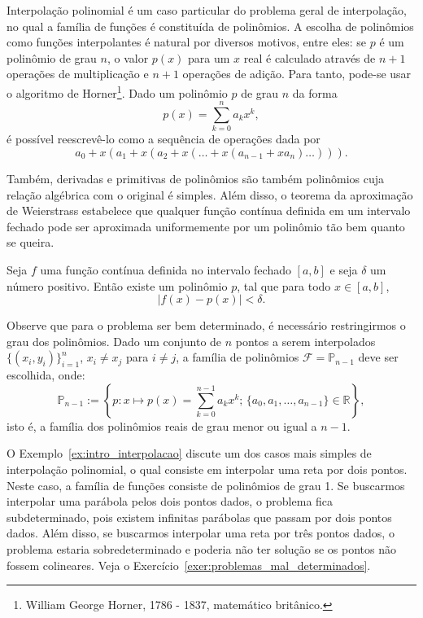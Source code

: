 Interpolação polinomial é um caso particular do problema geral de interpolação, no qual a família de funções é constituída de polinômios. A escolha de polinômios como funções interpolantes é natural por diversos  motivos, entre eles: se $p$ é um polinômio de grau $n$, o valor $p(x)$ para um $x$ real é calculado através de $n+1$ operações de multiplicação e $n+1$ operações de adição. Para tanto, pode-se usar o algoritmo de Horner\footnote{William George Horner, 1786 - 1837, matemático britânico.}. Dado um polinômio $p$ de grau $n$ da forma
\begin{equation*}
  p(x)=\sum_{k=0}^{n}a_k x^k,
\end{equation*}
é possível reescrevê-lo como a sequência de operações dada por
\begin{equation*}
  a_0 + x\left(a_1 + x\left(a_2 + x\left(\ldots + x\left(a_{n-1} + x a_n\right)\ldots\right)\right)\right).
\end{equation*}

Também, derivadas e primitivas de polinômios são também polinômios cuja relação algébrica com o original é simples. Além disso, o teorema da aproximação de Weierstrass estabelece que qualquer função contínua definida em um intervalo fechado pode ser aproximada uniformemente por um polinômio tão bem quanto se queira.

\begin{teo}[Weierstrass]Seja $f$ uma função contínua definida no intervalo fechado $[a,b]$ e seja $\delta$ um número positivo. Então existe um polinômio $p$, tal que para todo $x\in[a,b]$,
  \begin{equation*}
    |f(x)-p(x)|<\delta.
  \end{equation*}
\end{teo}

Observe que para o problema ser bem determinado, é necessário restringirmos o grau dos polinômios. Dado um conjunto de $n$ pontos a serem interpolados $\{(x_i,y_i)\}_{i=1}^{n}$, $x_i\neq x_j$ para $i\neq j$, a família de polinômios $\mathcal{F} = \mathbb{P}_{n-1}$ deve ser escolhida, onde:
\begin{equation*}
  \mathbb{P}_{n-1} := \left\{p : x\mapsto p(x) = \sum_{k=0}^{n-1}a_kx^k ;\, \{a_0,a_1,\ldots,a_{n-1}\}\in\mathbb{R}\right\},
\end{equation*}
isto é, a família dos polinômios reais de grau menor ou igual a $n-1$.

O Exemplo~\ref{ex:intro_interpolacao} discute um dos casos mais simples de interpolação polinomial, o qual consiste em interpolar uma reta por dois pontos. Neste caso, a família de funções consiste de polinômios de grau 1. Se buscarmos interpolar uma parábola pelos dois pontos dados, o problema fica subdeterminado, pois existem infinitas parábolas que passam por dois pontos dados. Além disso, se buscarmos interpolar uma reta por três pontos dados, o problema estaria sobredeterminado e poderia não ter solução se os pontos não fossem colineares. Veja o Exercício~\ref{exer:problemas_mal_determinados}.

